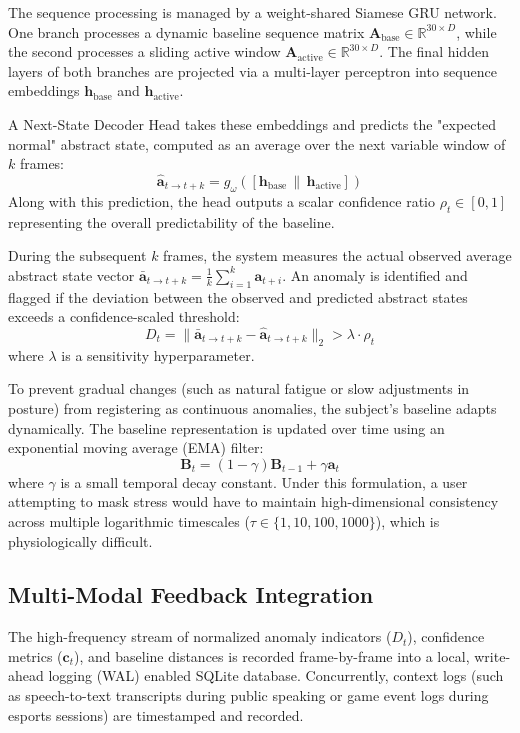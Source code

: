 \documentclass[sigconf]{acmart}
\begin{document}
The sequence processing is managed by a weight-shared Siamese GRU network. One branch processes a dynamic baseline sequence matrix $\mathbf{A}_{\text{base}} \in \mathbb{R}^{30 \times D}$, while the second processes a sliding active window $\mathbf{A}_{\text{active}} \in \mathbb{R}^{30 \times D}$. The final hidden layers of both branches are projected via a multi-layer perceptron into sequence embeddings $\mathbf{h}_{\text{base}}$ and $\mathbf{h}_{\text{active}}$.

A Next-State Decoder Head takes these embeddings and predicts the "expected normal" abstract state, computed as an average over the next variable window of $k$ frames:
$$\hat{\mathbf{a}}_{t \to t+k} = g_{\omega}([\mathbf{h}_{\text{base}} \,\|\, \mathbf{h}_{\text{active}}])$$
Along with this prediction, the head outputs a scalar confidence ratio $\rho_t \in [0, 1]$ representing the overall predictability of the baseline.

During the subsequent $k$ frames, the system measures the actual observed average abstract state vector $\bar{\mathbf{a}}_{t \to t+k} = \frac{1}{k}\sum_{i=1}^{k} \mathbf{a}_{t+i}$. An anomaly is identified and flagged if the deviation between the observed and predicted abstract states exceeds a confidence-scaled threshold:
$$D_t = \|\bar{\mathbf{a}}_{t \to t+k} - \hat{\mathbf{a}}_{t \to t+k}\|_2 > \lambda \cdot \rho_t$$
where $\lambda$ is a sensitivity hyperparameter.

To prevent gradual changes (such as natural fatigue or slow adjustments in posture) from registering as continuous anomalies, the subject's baseline adapts dynamically. The baseline representation is updated over time using an exponential moving average (EMA) filter:
$$\mathbf{B}_t = (1 - \gamma)\mathbf{B}_{t-1} + \gamma \mathbf{a}_t$$
where $\gamma$ is a small temporal decay constant. Under this formulation, a user attempting to mask stress would have to maintain high-dimensional consistency across multiple logarithmic timescales ($\tau \in \{1, 10, 100, 1000\}$), which is physiologically difficult.

\subsection{Multi-Modal Feedback Integration}
The high-frequency stream of normalized anomaly indicators ($D_t$), confidence metrics ($\mathbf{c}_t$), and baseline distances is recorded frame-by-frame into a local, write-ahead logging (WAL) enabled SQLite database. Concurrently, context logs (such as speech-to-text transcripts during public speaking or game event logs during esports sessions) are timestamped and recorded.
\end{document}
